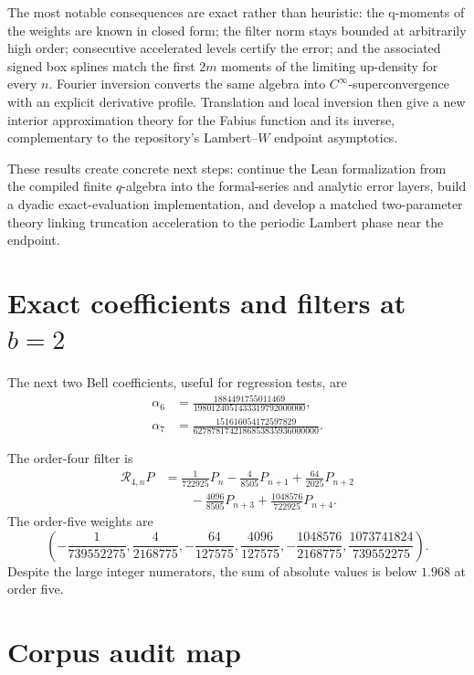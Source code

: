 \documentclass[11pt]{article}
\theoremstyle{definition}
\theoremstyle{remark}
\begin{document}
The most notable consequences are exact rather than heuristic: the q-moments of
the weights are known in closed form; the filter norm stays bounded at arbitrarily
high order; consecutive accelerated levels certify the error; and the associated
signed box splines match the first \(2m\) moments of the limiting up-density for
every \(n\). Fourier inversion converts the same algebra into
\(C^\infty\)-superconvergence with an explicit derivative profile. Translation
and local inversion then give a new interior approximation theory for the Fabius
function and its inverse, complementary to the repository's Lambert--\(W\)
endpoint asymptotics.

These results create concrete next steps: continue the Lean formalization from
the compiled finite \(q\)-algebra into the formal-series and analytic error
layers, build a dyadic exact-evaluation implementation, and develop a matched
two-parameter theory linking truncation acceleration to the periodic Lambert
phase near the endpoint.

\appendix

\section{Exact coefficients and filters at \texorpdfstring{\(b=2\)}{b=2}}
\label{app:coeff}

The next two Bell coefficients, useful for regression tests, are
\begin{align*}
 \alpha_6&=\frac{1884491755011469}
 {1980124051433319792000000},\\
 \alpha_7&=\frac{151616054172597829}
 {6278781742186853835936000000}.
\end{align*}

The order-four filter is
\begin{align*}
 \mathcal R_{4,n}P
 &=\frac1{722925}P_n-\frac4{8505}P_{n+1}
 +\frac{64}{2025}P_{n+2}\\
 &\qquad-\frac{4096}{8505}P_{n+3}
 +\frac{1048576}{722925}P_{n+4}.
\end{align*}
The order-five weights are
\[
 \left(
 -\frac1{739552275},\frac4{2168775},-\frac{64}{127575},
 \frac{4096}{127575},-\frac{1048576}{2168775},
 \frac{1073741824}{739552275}
 \right).
\]
Despite the large integer numerators, the sum of absolute values is below
\(1.968\) at order five.

\section{Corpus audit map}
\label{app:corpus}
\end{document}

